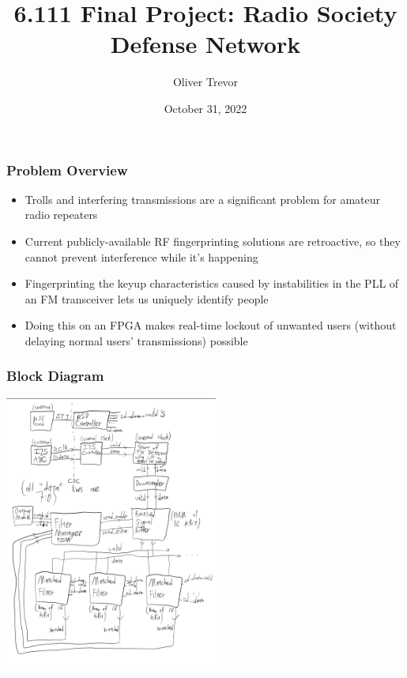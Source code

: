 \documentclass{beamer}
\title{6.111 Final Project: Radio Society Defense Network}
\author{Oliver Trevor}
\institute{MIT}
\date{October 31, 2022}
\begin{document}
    \frame{\titlepage}

    \begin{frame}
        \frametitle{Problem Overview}
        \begin{itemize}
            \item Trolls and interfering transmissions are a significant problem for amateur radio repeaters

            \item Current publicly-available RF fingerprinting solutions are retroactive, so they cannot prevent interference while it's happening

            \item Fingerprinting the keyup characteristics caused by instabilities in the PLL of an FM transceiver lets us uniquely identify people

            \item Doing this on an FPGA makes real-time lockout of unwanted users (without delaying normal users' transmissions) possible
        \end{itemize}
    \end{frame}

    \begin{frame}
        \frametitle{Block Diagram}

        \centerline{\includegraphics[width=7cm]{Block_Diagram_Drawing.png}}
    \end{frame}
\end{document}
